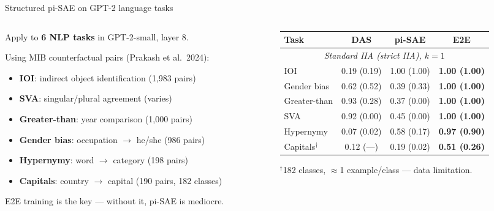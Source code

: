 \documentclass[aspectratio=169,11pt]{beamer}
\begin{document}
\begin{frame}{Structured pi-SAE on GPT-2 language tasks}
\vspace{-0.3em}

\begin{columns}[T]
\begin{column}{0.50\textwidth}
{\small Apply to \textbf{6 NLP tasks} in GPT-2-small, layer 8.}

\vspace{0.2em}
{\scriptsize Using MIB counterfactual pairs (Prakash et al.\ 2024):}
\begin{itemize}\setlength{\itemsep}{0pt}
  \item {\scriptsize \textbf{IOI}: indirect object identification (1,983 pairs)}
  \item {\scriptsize \textbf{SVA}: singular/plural agreement (varies)}
  \item {\scriptsize \textbf{Greater-than}: year comparison (1,000 pairs)}
  \item {\scriptsize \textbf{Gender bias}: occupation $\to$ he/she (986 pairs)}
  \item {\scriptsize \textbf{Hypernymy}: word $\to$ category (198 pairs)}
  \item {\scriptsize \textbf{Capitals}: country $\to$ capital (190 pairs, 182 classes)}
\end{itemize}

\vspace{0.2em}
{\scriptsize E2E training is the key --- without it, pi-SAE is mediocre.}
\end{column}
\begin{column}{0.48\textwidth}
{\scriptsize\centering
\renewcommand{\arraystretch}{1.05}
\begin{tabular}{l|ccc}
\toprule
\textbf{Task} & \textbf{DAS} & \textbf{pi-SAE} & \textbf{E2E} \\
\midrule
\multicolumn{4}{c}{\textit{Standard IIA (strict IIA), $k = 1$}} \\
\midrule
IOI          & 0.19 (0.19) & 1.00 (1.00) & \textbf{1.00 (1.00)} \\
Gender bias  & 0.62 (0.52) & 0.39 (0.33) & \textbf{1.00 (1.00)} \\
Greater-than & 0.93 (0.28) & 0.37 (0.00) & \textbf{1.00 (1.00)} \\
SVA          & 0.92 (0.00) & 0.45 (0.00) & \textbf{1.00 (1.00)} \\
Hypernymy    & 0.07 (0.02) & 0.58 (0.17) & \textbf{0.97 (0.90)} \\
Capitals$^\dagger$ & 0.12 (---) & 0.19 (0.02) & \textbf{0.51 (0.26)} \\
\bottomrule
\end{tabular}
}

\vspace{0.2em}
{\scriptsize $^\dagger$182 classes, $\approx$1 example/class --- data limitation.}
\end{column}
\end{columns}
\end{frame}
\end{document}
